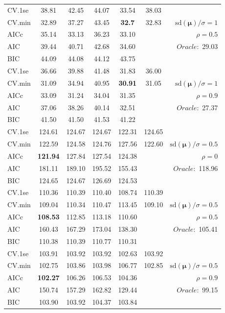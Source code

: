 \begin{table}
\begin{center}
\begin{tabular}{l*{5}{c}|r}
 \hline 
CV.1se & 38.81 & 42.45 & 44.07 & 33.54 & 38.03 & \\
CV.min & 32.89 & 37.27 & 43.45 & {\bf 32.7} & 32.83 &  $\mathrm{sd}(\mathbf{\mu})/\sigma=1$ \\
AICc & 35.14 & 33.13 & 36.23 & 33.10 & & $\rho=0.5$ \\
AIC & 39.44 & 40.71 & 42.68 & 34.60 & &  \multirow{2}{*}{$Oracle: $ 29.03} \\
BIC & 44.09 & 44.08 & 44.12 & 43.75 & &  \\
 \hline 
CV.1se & 36.66 & 39.88 & 41.48 & 31.83 & 36.00 & \\
CV.min & 31.09 & 34.94 & 40.95 & {\bf 30.91} & 31.05 &  $\mathrm{sd}(\mathbf{\mu})/\sigma=1$ \\
AICc & 33.09 & 31.24 & 34.04 & 31.35 & & $\rho=0.9$ \\
AIC & 37.06 & 38.26 & 40.14 & 32.51 & &  \multirow{2}{*}{$Oracle: $ 27.37} \\
BIC & 41.50 & 41.50 & 41.53 & 41.22 & &  \\
 \hline 
CV.1se & 124.61 & 124.67 & 124.67 & 122.31 & 124.65 & \\
CV.min & 122.59 & 124.58 & 124.76 & 127.56 & 122.60 &  $\mathrm{sd}(\mathbf{\mu})/\sigma=0.5$ \\
AICc & {\bf 121.94} & 127.84 & 127.54 & 124.38 & & $\rho=0$ \\
AIC & 181.11 & 189.10 & 195.52 & 155.43 & &  \multirow{2}{*}{$Oracle: $ 118.96} \\
BIC & 124.65 & 124.67 & 126.69 & 124.53 & &  \\
 \hline 
CV.1se & 110.36 & 110.39 & 110.40 & 108.74 & 110.39 & \\
CV.min & 109.04 & 110.34 & 110.47 & 113.45 & 109.10 &  $\mathrm{sd}(\mathbf{\mu})/\sigma=0.5$ \\
AICc & {\bf 108.53} & 112.85 & 113.18 & 110.60 & & $\rho=0.5$ \\
AIC & 160.43 & 167.29 & 173.04 & 138.30 & &  \multirow{2}{*}{$Oracle: $ 105.41} \\
BIC & 110.38 & 110.39 & 110.77 & 110.31 & &  \\
 \hline 
CV.1se & 103.91 & 103.92 & 103.92 & 102.63 & 103.92 & \\
CV.min & 102.75 & 103.86 & 103.98 & 106.77 & 102.85 &  $\mathrm{sd}(\mathbf{\mu})/\sigma=0.5$ \\
AICc & {\bf 102.27} & 106.26 & 106.53 & 104.36 & & $\rho=0.9$ \\
AIC & 150.74 & 157.29 & 162.82 & 129.44 & &  \multirow{2}{*}{$Oracle: $ 99.15} \\
BIC & 103.90 & 103.92 & 104.37 & 103.84 & &  \\
 \hline 
\end{tabular}
\end{center}
\vspace{-1cm}
\end{table}





